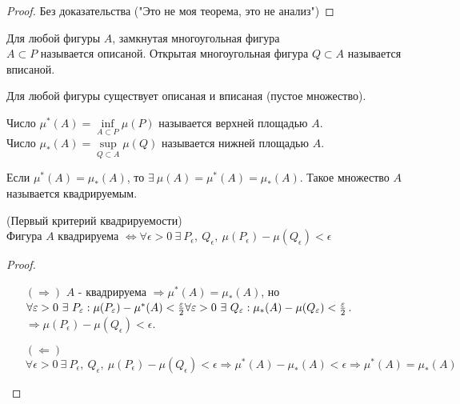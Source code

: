 \begin{proof}
    Без доказательства ("Это не моя теорема, это не анализ")
\end{proof} 
\begin{definition}
    Для любой фигуры $A$, замкнутая многоугольная фигура\\
    $A\subset P$ называется описаной. Открытая многоугольная фигура $Q\subset A$ называется вписаной.
\end{definition} 
\begin{comm}
    Для любой фигуры существует описаная и вписаная (пустое множество).
\end{comm} 
\begin{definition}
    Число $\mu^*(A)=\inf\limits_{A\subset P}\mu(P)$ называется верхней площадью $A$.\\
    Число $\mu_*(A)=\sup\limits_{Q\subset A}\mu(Q)$ называется нижней площадью $A$.
\end{definition} 
\begin{definition}
    Если $\mu^*(A)=\mu_*(A)$, то $\exists\ \mu(A)=\mu^*(A)=\mu_*(A)$. Такое множество $A$ называется квадрируемым.
\end{definition} 
\begin{theorem}
    (Первый критерий квадрируемости)\\
    Фигура $A$ квадрируема $\Leftrightarrow \forall \epsilon>0\ \exists\ P_{\epsilon},\ Q_{\epsilon},\ \mu(P_{\epsilon})-\mu(Q_{\epsilon})<\epsilon$
\end{theorem} 
\begin{proof}
    \begin{itemize}
        \item[$(\Rightarrow)$] $A$ - квадрируема $\Rightarrow \mu^*(A)=\mu_*(A)$, но \\
        $\forall \epsilon>0\ \exists\ P_{\epsilon}: \mu(P_{\epsilon})-\mu^*(A)<\frac{\epsilon}{2}\\ 
        \forall \epsilon>0\ \exists\ Q_{\epsilon}: \mu_*(A)-\mu(Q_{\epsilon})<\frac{\epsilon}{2}$.
        $\Rightarrow \mu(P_\epsilon)-\mu(Q_{\epsilon})<\epsilon$.
        \item[$(\Leftarrow)$] $\forall \epsilon>0\ \exists\ P_{\epsilon},\ Q_{\epsilon},\ \mu(P_{\epsilon})-\mu(Q_{\epsilon})<\epsilon \Rightarrow \mu^*(A)-\mu_*(A)<\epsilon \Rightarrow \mu^*(A)=\mu_*(A)$
    \end{itemize}
    
\end{proof} 